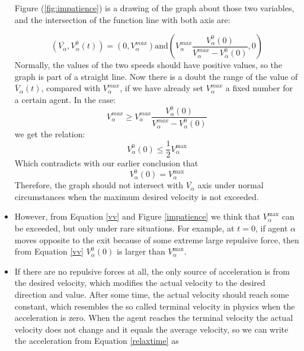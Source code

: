 \begin{itemize}
Figure (\ref{fig:impatience}) is a drawing of the graph about those two variables, and the intersection
 of the function line with both axis are:

\begin{equation}
\left( 
	\overline{V_{\alpha}} , V_{\alpha}^{0} \left( t \right)
\right)
=
\left( 
	0 
		, 
	V_{\alpha}^{max} 
\right) 
\text{and} 
\left(
	V_{\alpha}^{max} 
		\frac{V_{\alpha}^{0} \left( 0 \right) }{V_{\alpha}^{max}-V_{\alpha}^{0} \left(0 \right)} 
	, 0 
\right) 
\end{equation}
Normally, the values of the two speeds should have positive values, so the graph is part of a straight line.
Now there is a doubt the range of the value of $ \overline{V}_{\alpha} \left( t \right) $, compared with $ V_{\alpha}^{max} $, 
if we have already 
set $ V_{\alpha}^{max} $ a fixed number for a certain agent. In the case:
\begin{equation}
	V_{\alpha}^{max} 
	\geq 
	V_{\alpha}^{max} 
	\frac{V_{\alpha}^{0}(0)}{V_{\alpha}^{max}-V_{\alpha}^{0}(0)}
\end{equation}
we get the relation:
\begin{equation}
V_{\alpha}^{0}(0)\leq \frac{1}{2} V_{\alpha}^{\text{max}}
\end{equation}
Which contradicts with our earlier conclusion that
\begin{equation}
    V_{\alpha}^{0}\left( 0 \right) = V_{\alpha}^{\text{max}}
\end{equation}
Therefore, the graph should not intersect with $ \overline{V_{\alpha}} $ axis under normal circumstances when the maximum desired velocity is not exceeded.
\item However, from Equation \ref{vv}  and Figure \ref{impatience} we think that $V_{\alpha}^{\text{max}}$ can be exceeded, but only under rare situations. For example, at $ t=0 $, if agent $ \alpha $ moves opposite to the exit because of some extreme large repulsive force, then from Equation \ref{vv} $ V_{\alpha}^{0} \left( 0 \right)  $ is larger than $V_{\alpha}^{\text{max}}$.
\item If there are no repulsive forces at all, the only source of acceleration is from the desired velocity, which modifies the actual velocity to the desired direction and value.  After some time, the actual velocity should reach some constant, which resembles the so called terminal velocity in physics when the acceleration is zero.  When the agent reaches the terminal velocity the actual velocity does not change and it equals the average velocity, so we can write the acceleration from Equation \ref{relaxtime} as


\end{itemize}
